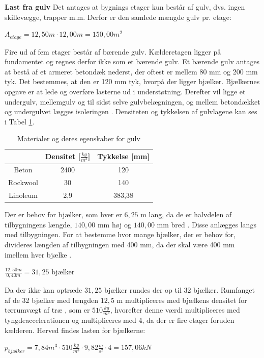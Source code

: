 \textbf{Last fra gulv}
\newline
Det antages at bygnings etager kun består af gulv, dvs. ingen skillevægge, trapper m.m. Derfor er den samlede mængde gulv pr. etage: 

\begin{center}
$A_{etage} = 12,\!50 m\cdot 12,\!00 m = 150,\!00 m^2$
\end{center}

Fire ud af fem etager består af bærende gulv. Kælderetagen ligger på fundamentet og regnes derfor ikke som et bærende gulv. 
\newline \indent{     }  Et bærende gulv antages at bestå af et armeret betondæk nederst, der oftest er mellem 80 mm og 200 mm tyk. Det bestemmes, at den er 120 mm tyk, hvorpå der ligger bjælker. Bjælkernes opgave er at lede og overføre lasterne ud i understøtning. Derefter vil ligge et undergulv, mellemgulv og til sidst selve gulvbelægningen, og mellem betondækket og undergulvet lægges isoleringen \citep{Gulvopbygning}. Densiteten og tykkelsen af gulvlagene kan ses i Tabel \ref{tab:densi}.

\begin{table}
	\begin{center}
		\begin{tabular}{|c|c|c|}
			\hline
			& Densitet [$\frac{kg}{m^3}$] & Tykkelse [mm] \\ \hline
			Beton    & 2400     & 120      \\ \hline
			Rockwool & 30       & 140      \\ \hline
			Linoleum & 2,9      & 383,38  \\ \hline
		\end{tabular}
		\caption{Materialer og deres egenskaber for gulv}
		\label{tab:densi}
	\end{center}
\end{table}

Der er behov for bjælker, som hver er $6,\!25$ m lang, da de er halvdelen af tilbygningens længde, $140,\!00$ mm høj og $140,\!00$ mm bred \citep{granse}. Disse anlægges langs med tilbygningen. For at bestemme hvor mange bjælker, der er behov for, divideres længden af tilbygningen med 400 mm, da der skal være 400 mm imellem hver bjælke \citep{Gulvopbygning}. 

\begin{center}
	$\frac{12,\!50 m}{0,\!40 m}=31,\!25$ bjælker
\end{center} 

Da der ikke kan optræde $31,\!25$ bjælker rundes der op til 32 bjælker.
\newline
\newline
Rumfanget af de 32 bjælker med længden $12,\!5$ m multipliceres med bjælkens densitet for tørrumvægt af træ \citep{torrumvagt}, som er $510 \frac{kg}{m^3}$, hvorefter denne værdi multipliceres med tyngdeaccelerationen og multipliceres med 4, da der er fire etager foruden kælderen. Herved findes lasten for bjælkerne: 
\begin{center}
	$p_{bjælker} = 7,\!84 m^3\cdot 510 \frac{kg}{m^3}\cdot 9,\!82 \frac{m}{s^2}\cdot 4 = 157,\!06 kN$
\end{center}

